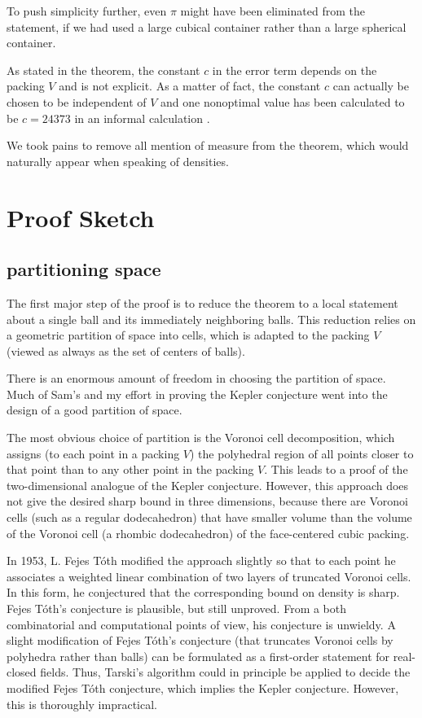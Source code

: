 \documentclass{amsart}
\begin{document}
To push simplicity further, even
$\pi$ might have been eliminated from the statement, if we had used a
large cubical container rather than a large spherical container.


As stated in the theorem, the constant $c$ in the error term depends
on the packing $V$ and is not explicit.  As a matter of fact, the
constant $c$ can actually be chosen to be independent of $V$ and one nonoptimal
value has been calculated to be $c=24373$ in an informal calculation
\cite{XX}.

We took pains to remove all mention of measure from the theorem, which
would naturally appear when speaking of densities.




\section{Proof Sketch}

\subsection{partitioning space}

The first major step of the proof is to reduce the theorem to a local
statement about a single ball and its immediately neighboring balls.
This reduction relies on a geometric partition of space into cells,
which is adapted to the packing $V$ (viewed as always as the set of
centers of balls).

There is an enormous amount of freedom in choosing the partition
of space.  Much of Sam's and my effort in proving the Kepler conjecture
went into the design of a good partition of space.  

The most obvious choice of partition is the Voronoi cell
decomposition, which assigns (to each point in a packing $V$) the
polyhedral region of all points closer to that point than to any other
point in the packing $V$. This leads to a proof of the two-dimensional
analogue of the Kepler conjecture.  However, this approach does not
give the desired sharp bound in three dimensions, because there are
Voronoi cells (such as a regular dodecahedron) that have smaller
volume than the volume of the Voronoi cell (a rhombic dodecahedron) of
the face-centered cubic packing.

In 1953, L. Fejes T\'oth modified the approach slightly so that to each
point he associates a weighted linear combination of two layers of
truncated Voronoi cells.  In this form, he conjectured that the
corresponding bound on density is sharp.  Fejes T\'oth's conjecture is
plausible, but still unproved.  From a both combinatorial and
computational points of view, his conjecture is unwieldy.  A slight modification
of Fejes T\'oth's conjecture (that truncates Voronoi cells by
polyhedra rather than balls) can be formulated as a first-order statement for
real-closed fields.  Thus, Tarski's algorithm could in principle be
applied to decide the modified Fejes T\'oth conjecture, which implies
the Kepler conjecture.  However, this is thoroughly impractical.
\end{document}

